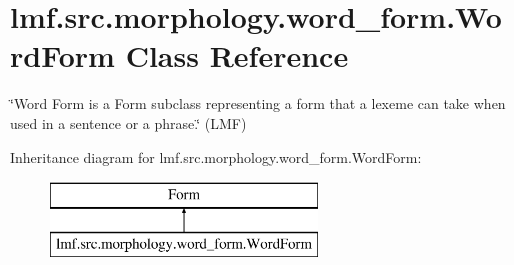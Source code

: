 \hypertarget{classlmf_1_1src_1_1morphology_1_1word__form_1_1_word_form}{\section{lmf.\+src.\+morphology.\+word\+\_\+form.\+Word\+Form Class Reference}
\label{classlmf_1_1src_1_1morphology_1_1word__form_1_1_word_form}
}


\char`\"{}\+Word Form is a Form subclass representing a form that a lexeme can take when used in a sentence or a phrase.\char`\"{} (L\+M\+F)  


Inheritance diagram for lmf.\+src.\+morphology.\+word\+\_\+form.\+Word\+Form\+:\begin{figure}[H]
\begin{center}
\leavevmode
\includegraphics[height=2.000000cm]{classlmf_1_1src_1_1morphology_1_1word__form_1_1_word_form}
\end{center}
\end{figure}
